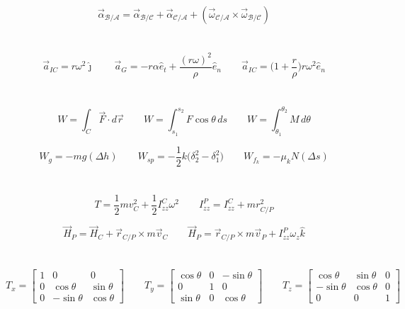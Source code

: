 \documentclass{article}
\begin{document}
\[
\vec\alpha_{\mathcal B/\mathcal A}=\vec\alpha_{\mathcal B/\mathcal C}+\vec\alpha_{\mathcal C/\mathcal A}+(\vec\omega_{\mathcal C/\mathcal A}\times\vec\omega_{\mathcal B/\mathcal C})
\]

\section*{}
\[
\vec a_{IC}=r\omega^2\hat\jmath \qquad
\vec a_G=-r\alpha\hat e_t+\frac{(r\omega)^2}{\rho}\hat e_n \qquad
\vec a_{IC}=\biggl(1+\frac{r}{\rho}\biggr)r\omega^2\hat e_n
\]

\newpage

\section*{}
\[
W=\int_C\vec F\cdot d\vec r \qquad
W=\int_{s_1}^{s_2}F\cos\theta\,ds \qquad
W=\int_{\theta_1}^{\theta_2}M\,d\theta
\]

\[
W_g=-mg(\Delta h) \qquad
W_{sp}=-\frac{1}{2}k\bigl(\delta_2^2-\delta_1^2\bigr) \qquad
W_{f_k}=-\mu_kN(\Delta s)
\]

\section*{}
\[
T=\frac{1}{2}mv_C^2+\frac{1}{2}I_{zz}^C\omega^2 \qquad
I_{zz}^P=I_{zz}^C+mr_{C/P}^2
\]

\[
\vec H_P=\vec H_C+\vec r_{C/P}\times m\vec v_C \qquad
\vec H_P=\vec r_{C/P}\times m\vec v_P+I_{zz}^P\omega_z\hat k
\]

\section*{}
\[
T_x=
\begin{bmatrix}
1 & 0 & 0 \\
0 & \cos\theta & \sin\theta \\
0 & -\sin\theta & \cos\theta
\end{bmatrix}
\qquad
T_y=
\begin{bmatrix}
\cos\theta & 0 & -\sin\theta \\
0 & 1 & 0 \\
\sin\theta & 0 & \cos\theta
\end{bmatrix}
\qquad
T_z=
\begin{bmatrix}
\cos\theta & \sin\theta & 0 \\
-\sin\theta & \cos\theta & 0 \\
0 & 0 & 1
\end{bmatrix}
\]
\end{document}

